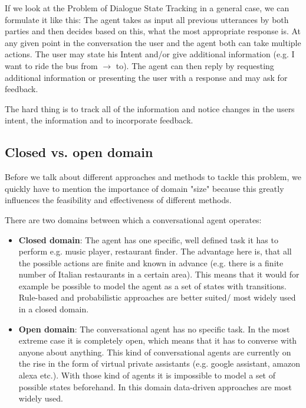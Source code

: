 \documentclass[conference]{IEEEtran}
\begin{document}
If we look at the Problem of Dialogue State Tracking in a general case, we can formulate it like this:
The agent takes as input all previous utterances by both parties and then decides based on this, what the most appropriate response is.
At any given point in the conversation the user and the agent both can take multiple actions. 
The user may state his Intent and/or give additional information (e.g. I want to ride the bus from $\rightarrow$ to). The agent can then reply by requesting additional information or presenting the user with a response and may ask for feedback.

The hard thing is to track all of the information and notice changes in the users intent, the information and to incorporate feedback.

\subsection{Closed vs. open domain}
Before we talk about different approaches and methods to tackle this problem, we quickly have to mention the importance of domain "size" because this greatly influences the feasibility and effectiveness of different methods.

There are two domains\cite{yan2016shall} between which a conversational agent operates:
\begin{itemize}
\item{\textbf{Closed domain}: The agent has one specific, well defined task it has to perform e.g. music player, restaurant finder. The advantage here is, that all the possible actions are finite and known in advance\cite{radlinski2017theoretical} (e.g. there is a finite number of Italian restaurants in a certain area). This means that it would for example be possible to model the agent as a set of states with transitions. Rule-based and probabilistic approaches are better suited/ most widely used in a closed domain.}
\item{\textbf{Open domain}: The conversational agent has no specific task. In the most extreme case it is completely open, which means that it has to converse with anyone about anything. This kind of conversational agents are currently on the rise in the form of virtual private 	assistants (e.g. google assistant, amazon alexa etc.)\cite{klopfenstein2017rise}. With those kind of agents it is impossible to model a set of possible states beforehand. In this domain data-driven approaches are most widely used.}
\end{itemize}
\end{document}
